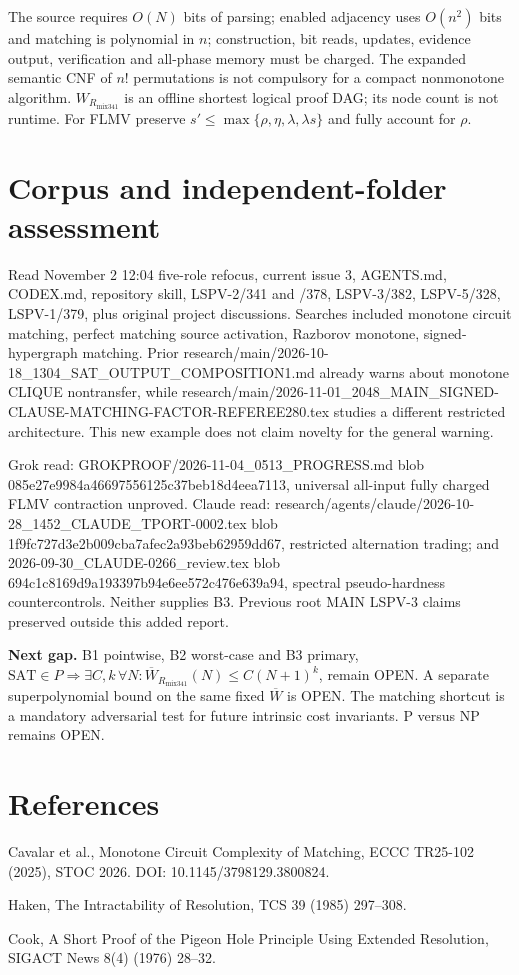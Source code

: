 \documentclass[11pt]{article}
\begin{document}
The source requires $O(N)$ bits of parsing; enabled adjacency uses $O(n^2)$ bits and matching is polynomial in $n$; construction, bit reads, updates, evidence output, verification and all-phase memory must be charged. The expanded semantic CNF of $n!$ permutations is not compulsory for a compact nonmonotone algorithm. $W_{R_{\mathrm{mix341}}}$ is an offline shortest logical proof DAG; its node count is not runtime. For FLMV preserve $s'\le\max\{\rho,\eta,\lambda,\lambda s\}$ and fully account for $\rho$.

\section*{Corpus and independent-folder assessment}
Read November 2 12:04 five-role refocus, current issue 3, AGENTS.md, CODEX.md, repository skill, LSPV-2/341 and /378, LSPV-3/382, LSPV-5/328, LSPV-1/379, plus original project discussions. Searches included monotone circuit matching, perfect matching source activation, Razborov monotone, signed-hypergraph matching. Prior research/main/2026-10-18_1304_SAT_OUTPUT_COMPOSITION1.md already warns about monotone CLIQUE nontransfer, while research/main/2026-11-01_2048_MAIN_SIGNED-CLAUSE-MATCHING-FACTOR-REFEREE280.tex studies a different restricted architecture. This new example does not claim novelty for the general warning.

Grok read: GROKPROOF/2026-11-04_0513_PROGRESS.md blob 085e27e9984a46697556125c37beb18d4eea7113, universal all-input fully charged FLMV contraction unproved. Claude read: research/agents/claude/2026-10-28_1452_CLAUDE_TPORT-0002.tex blob 1f9fc727d3e2b009cba7afec2a93beb62959dd67, restricted alternation trading; and 2026-09-30_CLAUDE-0266_review.tex blob 694c1c8169d9a193397b94e6ee572c476e639a94, spectral pseudo-hardness countercontrols. Neither supplies B3. Previous root MAIN LSPV-3 claims preserved outside this added report.

\noindent\textbf{Next gap.} B1 pointwise, B2 worst-case and B3 primary, $\mathrm{SAT}\in P\Rightarrow\exists C,k\,\forall N:\overline W_{R_{\mathrm{mix341}}}(N)\le C(N+1)^k$, remain OPEN. A separate superpolynomial bound on the same fixed $\overline W$ is OPEN. The matching shortcut is a mandatory adversarial test for future intrinsic cost invariants. P versus NP remains OPEN.

\section*{References}
\noindent[1] Cavalar et al., Monotone Circuit Complexity of Matching, ECCC TR25-102 (2025), STOC 2026. DOI: 10.1145/3798129.3800824.\par
\noindent[2] Haken, The Intractability of Resolution, TCS 39 (1985) 297--308.\par
\noindent[3] Cook, A Short Proof of the Pigeon Hole Principle Using Extended Resolution, SIGACT News 8(4) (1976) 28--32.\par
\end{document}
